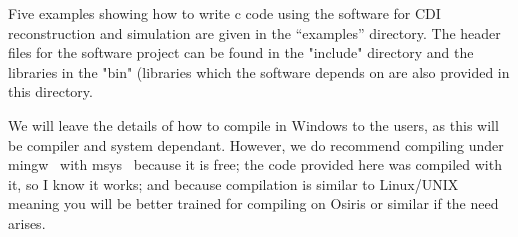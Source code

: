 \documentclass[]{nadia}
\begin{document}
Five examples showing how to write c code using the \name software for
CDI reconstruction and simulation are given in the ``examples''
directory.  The header files for the \name software project can be found
in the "include" directory and the libraries in the "bin" (libraries
which the \name software depends on are also provided in this directory.

We will leave the details of how to compile in Windows to the users,
as this will be compiler and system dependant. However, we do
recommend compiling under mingw~\cite{mingw} with msys~\cite{msys} because it
is free; the code provided here was compiled with it, so I know it
works; and because compilation is similar to Linux/UNIX meaning you
will be better trained for compiling on Osiris or similar if the need
arises.





\end{document}
